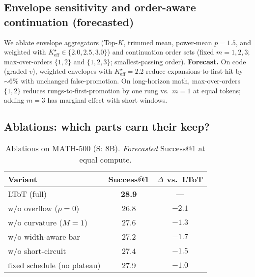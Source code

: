 \documentclass{article}
\begin{document}
\subsection{Envelope sensitivity and order-aware continuation (forecasted)}
\label{subsec:ablations}
We ablate envelope aggregators (Top-$K$, trimmed mean, power-mean $p{=}1.5$, and weighted with $K_{\mathrm{eff}}^\star\!\in\!\{2.0,2.5,3.0\}$)
and continuation order sets (fixed $m{=}1,2,3$; max-over-orders $\{1,2\}$ and $\{1,2,3\}$; smallest-passing order).
\textbf{Forecast.} On code (graded $v$), weighted envelopes with $K_{\mathrm{eff}}^\star{=}2.2$ reduce expansions-to-first-hit by $\sim\!6\%$ with unchanged false-promotion.
On long-horizon math, max-over-orders $\{1,2\}$ reduces rungs-to-first-promotion by one rung vs.\ $m{=}1$ at equal tokens; adding $m{=}3$ has marginal effect with short windows.




\subsection{Ablations: which parts earn their keep?}
\label{subsec:ablations}

\begin{table}[t]
\centering
\caption{Ablations on MATH-500 (S: 8B). \emph{Forecasted} Success@1 at equal compute.}
\vspace{0.3em}
\begin{tabular}{lcc}
\toprule
\textbf{Variant} & \textbf{Success@1} & \textbf{$\Delta$ vs.\ LToT} \\
\midrule
LToT (full)                         & \textbf{28.9} & --- \\
\quad w/o overflow ($\rho{=}0$)     & 26.8 & $-2.1$ \\
\quad w/o curvature ($M{=}1$)       & 27.6 & $-1.3$ \\
\quad w/o width-aware bar           & 27.2 & $-1.7$ \\
\quad w/o short-circuit             & 27.4 & $-1.5$ \\
\quad fixed schedule (no plateau)   & 27.9 & $-1.0$ \\
\bottomrule
\end{tabular}
\label{tab:ablations}
\end{table}
\end{document}
